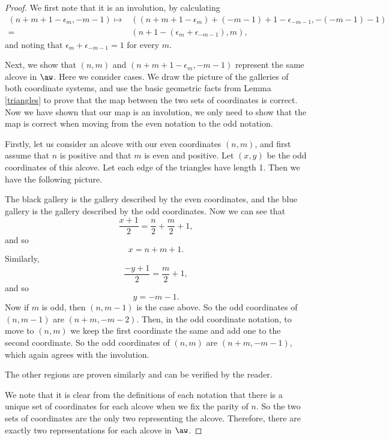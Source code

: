 \documentclass[11pt]{article}
\begin{document}
\begin{proof}
    We first note that it is an involution, by calculating
    \begin{align*}
        (n+m+1-\epsilon_m,-m-1)\mapsto& ((n+m+1-\epsilon_m)+(-m-1)+1-\epsilon_{-m-1},-(-m-1)-1)\\=&(n+1-(\epsilon_m+\epsilon_{-m-1}),m),
    \end{align*}
    and noting that $\epsilon_m+\epsilon_{-m-1}=1$ for every $m$. 

    Next, we show that $(n,m)$ and $(n+m+1-\epsilon_m,-m-1)$ represent the same alcove in $\aw$. Here we consider cases. We draw the picture of the galleries of both coordinate systems, and use the basic geometric facts from Lemma \ref{triangles} to prove that the map between the two sets of coordinates is correct. Now we have shown that our map is an involution, we only need to show that the map is correct when moving from the even notation to the odd notation.

    Firstly, let us consider an alcove with our even coordinates $(n,m)$, and first assume that $n$ is positive and that $m$ is even and positive. Let $(x,y)$ be the odd coordinates of this alcove. Let each edge of the triangles have length 1. Then we have the following picture.
    

\begin{center}
\resizebox{0.4\linewidth}{!}{}
\end{center}


The black gallery is the gallery described by the even coordinates, and the blue gallery is the gallery described by the odd coordinates. Now we can see that 
\[\dfrac{x+1}{2}=\dfrac{n}{2}+\dfrac{m}{2}+1,\]
and so 
\[x=n+m+1.\]
Similarly, 
\[\dfrac{-y+1}{2}=\dfrac{m}{2}+1,\]
and so 
\[y=-m-1.\]
 Now if $m$ is odd, then $(n,m-1)$ is the case above. So the odd coordinates of $(n,m-1)$ are $(n+m,-m-2)$. Then, in the odd coordinate notation, to move to $(n,m)$ we keep the first coordinate the same and add one to the second coordinate. So the odd coordinates of $(n,m)$ are $(n+m,-m-1)$, which again agrees with the involution.

The other regions are proven similarly and can be verified by the reader. 

We note that it is clear from the definitions of each notation that there is a unique set of coordinates for each alcove when we fix the parity of $n$. So the two sets of coordinates are the only two representing the alcove. 
Therefore, there are exactly two representations for each alcove in $\aw$. 
\end{proof}
\end{document}

